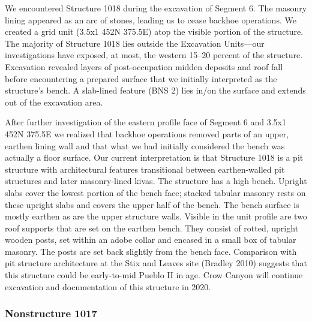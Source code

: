 \documentclass[
  12pt,
]{krantz}
\begin{document}
We encountered Structure 1018 during the excavation of Segment 6. The
masonry lining appeared as an arc of stones, leading us to cease backhoe
operations. We created a grid unit (3.5x1 452N 375.5E) atop the visible
portion of the structure. The majority of Structure 1018 lies outside
the Excavation Units---our investigations have exposed, at most, the
western 15--20 percent of the structure. Excavation revealed layers of
post-occupation midden deposits and roof fall before encountering a
prepared surface that we initially interpreted as the structure's bench.
A slab-lined feature (BNS 2) lies in/on the surface and extends out of
the excavation area.

After further investigation of the eastern profile face of Segment 6 and
3.5x1 452N 375.5E we realized that backhoe operations removed parts of
an upper, earthen lining wall and that what we had initially considered
the bench was actually a floor surface. Our current interpretation is
that Structure 1018 is a pit structure with architectural features
transitional between earthen-walled pit structures and later
masonry-lined kivas. The structure has a high bench. Upright slabs cover
the lowest portion of the bench face; stacked tabular masonry rests on
these upright slabs and covers the upper half of the bench. The bench
surface is mostly earthen as are the upper structure walls. Visible in
the unit profile are two roof supports that are set on the earthen
bench. They consist of rotted, upright wooden posts, set within an adobe
collar and encased in a small box of tabular masonry. The posts are set
back slightly from the bench face. Comparison with pit structure
architecture at the Stix and Leaves site (Bradley 2010) suggests that
this structure could be early-to-mid Pueblo II in age. Crow Canyon will
continue excavation and documentation of this structure in 2020.

\hypertarget{nonstructure-1017}{%
\subsubsection{Nonstructure 1017}\label{nonstructure-1017}}
\end{document}
